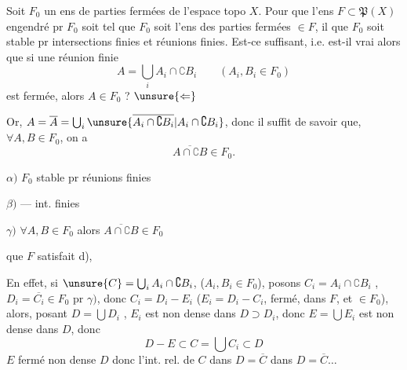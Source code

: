 
Soit $F_0$ un ens de parties fermées de l'espace topo $X$. Pour que l'ens $F\subset\mathfrak P(X)$  engendré pr $F_0$ soit tel que $F_0$ soit  l'ens des parties fermées $\in F$, il  que $F_0$ soit stable pr intersections finies et réunions finies. Est-ce suffisant, i.e. est-il vrai alors que si une réunion finie
\[
A=\bigcup_i A_i\cap\complement B_i\qquad(A_i,B_i\in F_0)
\]
est fermée, alors $A\in F_0$ ? $\unsure{\Leftarrow}$

Or, $A=\overline A=\bigcup_i\unsure{\overline{A_i\cap\complement B_i}|A_i\cap\complement B_i}$, donc il suffit de savoir que, $\forall A,B\in F_0$, on a
\[
\overline{A\cap\complement B}\in F_0.
\]
     

$\alpha)$ $F_0$ stable pr réunions finies

$\beta)$ — int. finies

$\gamma)$ $\forall A,B\in F_0$ alors $\overline{A\cap\complement B}\in F_0$

  que $F$ satisfait  d), 

En effet, si $\unsure{C}=\bigcup_i A_i\cap\complement B_i$, ($A_i,B_i\in F_0$), posons $C_i=A_i\cap\complement B_i$ , $D_i=\overline{C_i}\in F_0$ pr $\gamma)$, donc $C_i=D_i-E_i$ ($E_i=D_i-C_i$, fermé,  dans $F$, et $\in F_0$), alors, posant $D=\bigcup D_i$ , $E_i$ est   non dense dans $D\supset D_i$, donc $E=\bigcup E_i$ est non dense dans $D$, donc
\[
D-E\subset C=\bigcup C_i\subset D
\]
 $E$ fermé non dense $D$ donc l'int. rel. de $C$ dans $D=\overline C$    dans $D=\overline C\ldots$

